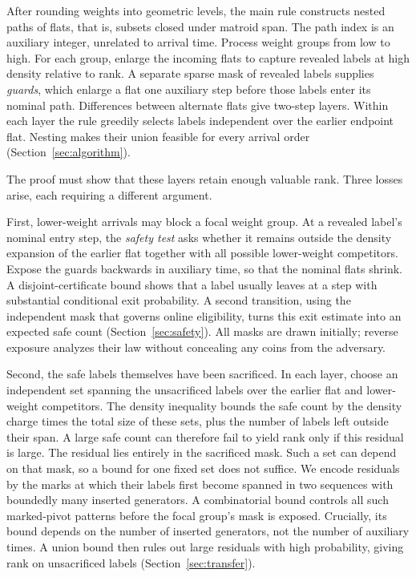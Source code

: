 After rounding weights into geometric levels, the main rule constructs
nested paths of flats, that is, subsets closed under matroid span. The
path index is an auxiliary integer, unrelated to arrival time. Process
weight groups from low to high. For each group, enlarge the incoming
flats to capture revealed labels at high density relative to rank. A
separate sparse mask of revealed labels supplies \emph{guards}, which
enlarge a flat one auxiliary step before those labels enter its nominal
path. Differences between alternate flats give two-step layers. Within
each layer the rule greedily selects labels independent over the earlier
endpoint flat. Nesting makes their union feasible for every arrival
order (Section~\ref{sec:algorithm}).

The proof must show that these layers retain enough valuable rank. Three
losses arise, each requiring a different argument.

First, lower-weight arrivals may block a focal weight group. At a
revealed label's nominal entry step, the \emph{safety test} asks whether
it remains outside the density expansion of the earlier flat together
with all possible lower-weight competitors. Expose the guards backwards in
auxiliary time, so that the nominal flats shrink. A
disjoint-certificate bound shows that a label usually leaves at a step
with substantial conditional exit probability. A second transition,
using the independent mask that governs online eligibility, turns this
exit estimate into an expected safe count
(Section~\ref{sec:safety}). All masks are drawn initially; reverse
exposure analyzes their law without concealing any coins from the
adversary.

Second, the safe labels themselves have been sacrificed. In each layer,
choose an independent set spanning the unsacrificed labels over the
earlier flat and lower-weight competitors. The density inequality bounds
the safe count by the density charge times the total size of these sets,
plus the number of labels left outside their span. A large safe count can
therefore fail to yield rank only if this residual is large. The residual
lies entirely in the sacrificed mask. Such a set can depend on that mask,
so a bound for one fixed set does not suffice. We encode residuals by
the marks at which their labels first become spanned in two sequences
with boundedly many inserted generators. A combinatorial bound controls
all such marked-pivot patterns before the focal group's mask is exposed.
Crucially, its bound depends on the number of inserted generators, not
the number of auxiliary times. A union bound then rules
out large residuals with high probability, giving rank on unsacrificed
labels (Section~\ref{sec:transfer}).

